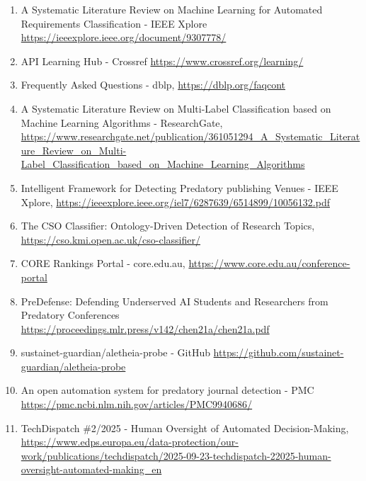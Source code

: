 \documentclass[11pt,a4paper]{article}
\begin{document}
\begin{enumerate}[leftmargin=1.25em]
\item A Systematic Literature Review on Machine Learning for Automated Requirements Classification - IEEE Xplore \url{https://ieeexplore.ieee.org/document/9307778/}
\item API Learning Hub - Crossref \url{https://www.crossref.org/learning/}
\item Frequently Asked Questions - dblp,  \url{https://dblp.org/faqcont}
\item A Systematic Literature Review on Multi-Label Classification based on Machine Learning Algorithms - ResearchGate,  \url{https://www.researchgate.net/publication/361051294_A_Systematic_Literature_Review_on_Multi-Label_Classification_based_on_Machine_Learning_Algorithms}
\item Intelligent Framework for Detecting Predatory publishing Venues - IEEE Xplore,  \url{https://ieeexplore.ieee.org/iel7/6287639/6514899/10056132.pdf}
\item The CSO Classifier: Ontology-Driven Detection of Research Topics, \url{https://cso.kmi.open.ac.uk/cso-classifier/}
\item CORE Rankings Portal - core.edu.au,  \url{https://www.core.edu.au/conference-portal}
\item PreDefense: Defending Underserved AI Students and Researchers from Predatory Conferences \url{https://proceedings.mlr.press/v142/chen21a/chen21a.pdf}
\item sustainet-guardian/aletheia-probe - GitHub \url{https://github.com/sustainet-guardian/aletheia-probe}
\item An open automation system for predatory journal detection - PMC \url{https://pmc.ncbi.nlm.nih.gov/articles/PMC9940686/}
\item TechDispatch \#2/2025 - Human Oversight of Automated Decision-Making, \url{https://www.edps.europa.eu/data-protection/our-work/publications/techdispatch/2025-09-23-techdispatch-22025-human-oversight-automated-making_en}
\end{enumerate}
\end{document}
